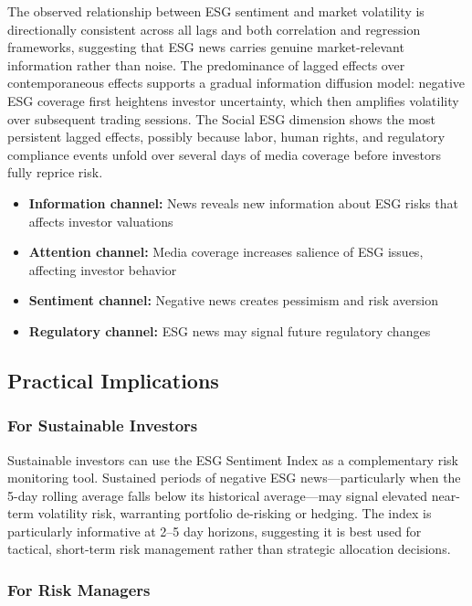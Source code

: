 \documentclass[12pt,a4paper]{article}
\begin{document}
The observed relationship between ESG sentiment and market volatility is directionally consistent across all lags and both correlation and regression frameworks, suggesting that ESG news carries genuine market-relevant information rather than noise. The predominance of lagged effects over contemporaneous effects supports a gradual information diffusion model: negative ESG coverage first heightens investor uncertainty, which then amplifies volatility over subsequent trading sessions. The Social ESG dimension shows the most persistent lagged effects, possibly because labor, human rights, and regulatory compliance events unfold over several days of media coverage before investors fully reprice risk.

\begin{itemize}[itemsep=0.5em]
    \item \textbf{Information channel:} News reveals new information about ESG risks that affects investor valuations
    \item \textbf{Attention channel:} Media coverage increases salience of ESG issues, affecting investor behavior
    \item \textbf{Sentiment channel:} Negative news creates pessimism and risk aversion
    \item \textbf{Regulatory channel:} ESG news may signal future regulatory changes
\end{itemize}

\subsection{Practical Implications}
\label{subsec:implications}

\subsubsection{For Sustainable Investors}
\label{subsubsec:impl-investors}

Sustainable investors can use the ESG Sentiment Index as a complementary risk monitoring tool. Sustained periods of negative ESG news---particularly when the 5-day rolling average falls below its historical average---may signal elevated near-term volatility risk, warranting portfolio de-risking or hedging. The index is particularly informative at 2--5 day horizons, suggesting it is best used for tactical, short-term risk management rather than strategic allocation decisions.

\subsubsection{For Risk Managers}
\label{subsubsec:impl-risk}
\end{document}
